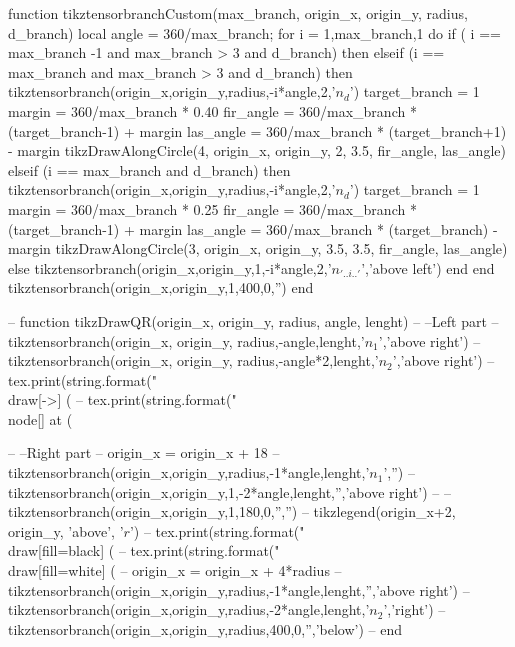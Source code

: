 \begin{luacode*}
    function tikztensorbranchCustom(max_branch, origin_x, origin_y, radius, d_branch)
      local angle = 360/max_branch;
      for i = 1,max_branch,1 do
          if ( i == max_branch -1 and max_branch > 3 and d_branch) then
          elseif (i == max_branch and max_branch > 3 and d_branch)  then
            tikztensorbranch(origin_x,origin_y,radius,-i*angle,2,'$n_{d}$')
            target_branch = 1
            margin = 360/max_branch * 0.40
            fir_angle = 360/max_branch * (target_branch-1) + margin
            las_angle = 360/max_branch * (target_branch+1) - margin          
            tikzDrawAlongCircle(4, origin_x, origin_y, 2, 3.5, fir_angle, las_angle)
          elseif (i == max_branch and d_branch)  then
            tikztensorbranch(origin_x,origin_y,radius,-i*angle,2,'$n_{d}$')
            target_branch = 1
            margin = 360/max_branch * 0.25
            fir_angle = 360/max_branch * (target_branch-1) + margin
            las_angle = 360/max_branch * (target_branch) - margin          
            tikzDrawAlongCircle(3, origin_x, origin_y, 3.5, 3.5, fir_angle, las_angle)
          else
            tikztensorbranch(origin_x,origin_y,1,-i*angle,2,'$n_{'..i..'}$','above left')
          end
        end
        tikztensorbranch(origin_x,origin_y,1,400,0,'')
    end
  
    -- function tikzDrawQR(origin_x, origin_y, radius, angle, lenght)
    --   --Left part
    --     tikztensorbranch(origin_x, origin_y, radius,-angle,lenght,'$n_{1}$','above right')
    --     tikztensorbranch(origin_x, origin_y, radius,-angle*2,lenght,'$n_{2}$','above right')
    --     tex.print(string.format("\\draw[->] (%
    --     tex.print(string.format("\\node[] at (%
  
    --   --Right part
    --     origin_x = origin_x + 18
    --     tikztensorbranch(origin_x,origin_y,radius,-1*angle,lenght,'$n_{1}$','')
    --     tikztensorbranch(origin_x,origin_y,1,-2*angle,lenght,'','above right')
    --     --tikztensorbranch(origin_x,origin_y,1,180,0,'','')
    --     tikzlegend(origin_x+2, origin_y, 'above', '$r$')
    --     tex.print(string.format("\\draw[fill=black] (%
    --     tex.print(string.format("\\draw[fill=white] (%
    --     origin_x = origin_x + 4*radius
    --     tikztensorbranch(origin_x,origin_y,radius,-1*angle,lenght,'','above right')
    --     tikztensorbranch(origin_x,origin_y,radius,-2*angle,lenght,'$n_{2}$','right')
    --     tikztensorbranch(origin_x,origin_y,radius,400,0,'','below')
    -- end
  

\end{luacode*}
